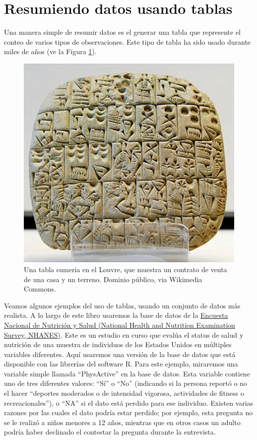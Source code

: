 \documentclass[
  12pt,
]{book}
\begin{document}
\hypertarget{resumiendo-datos-usando-tablas}{%
\section{Resumiendo datos usando tablas}\label{resumiendo-datos-usando-tablas}}

Una manera simple de resumir datos es el generar una tabla que represente el conteo de varios tipos de observaciones. Este tipo de tabla ha sido usado durante miles de años (ve la Figura \ref{fig:salesContract}).

\begin{figure}
\includegraphics[height=0.3\textheight]{images/Sales_contract_Shuruppak_Louvre_AO3760} \caption{Una tabla sumeria en el Louvre, que muestra un contrato de venta de una casa y un terreno. Dominio público, via Wikimedia Commons.}\label{fig:salesContract}
\end{figure}

Veamos algunos ejemplos del uso de tablas, usando un conjunto de datos más realista. A lo largo de este libro usaremos la base de datos de la \href{https://www.cdc.gov/nchs/nhanes/index.htm}{Encuesta Nacional de Nutrición y Salud (National Health and Nutrition Examination Survey, NHANES)}. Este es un estudio en curso que evalúa el status de salud y nutrición de una muestra de individuos de los Estados Unidos en múltiples variables diferentes. Aquí usaremos una versión de la base de datos que está disponible con las librerías del software R. Para este ejemplo, miraremos una variable simple llamada ``PhysActive'' en la base de datos. Esta variable contiene uno de tres diferentes valores: ``Sí'' o ``No'' (indicando si la persona reportó o no el hacer ``deportes moderados o de intensidad vigorosa, actividades de fitness o recreacionales''), o ``NA'' si el dato está perdido para ese individuo. Existen varias razones por las cuales el dato podría estar perdido; por ejemplo, esta pregunta no se le realizó a niños menores a 12 años, mientras que en otros casos un adulto podría haber declinado el contestar la pregunta durante la entrevista.
\end{document}
